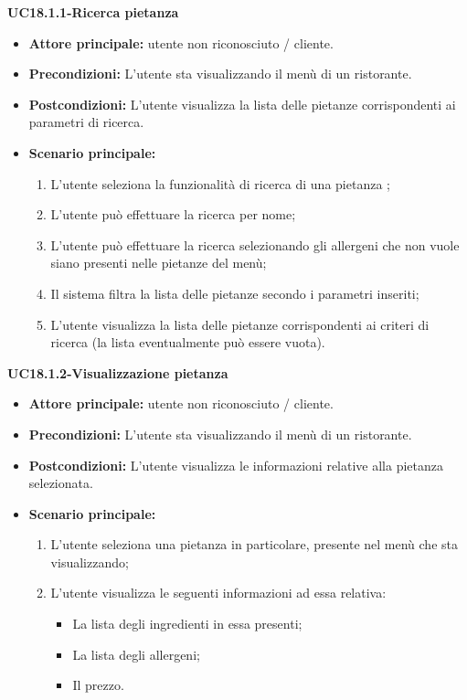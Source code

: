 \textbf{UC18.1.1-Ricerca pietanza}
\begin{itemize}
\item \textbf{Attore principale:} utente non riconosciuto / cliente.
\item \textbf{Precondizioni:} L'utente sta visualizzando il menù di un ristorante.
\item \textbf{Postcondizioni:} L'utente visualizza la lista delle pietanze corrispondenti ai parametri di ricerca.
\item \textbf{Scenario principale:}
\begin{enumerate}
    \item L'utente seleziona la funzionalità di ricerca di una pietanza ;
    \item L'utente può effettuare la ricerca per nome;
    \item L'utente può effettuare la ricerca selezionando gli allergeni che non vuole 
    siano presenti nelle pietanze del menù;
    \item Il sistema filtra la lista delle pietanze secondo i parametri inseriti;
    \item L'utente visualizza la lista delle pietanze corrispondenti ai criteri di ricerca
    (la lista eventualmente può essere vuota).
\end{enumerate}
\end{itemize}



\textbf{UC18.1.2-Visualizzazione pietanza}
\begin{itemize}
\item \textbf{Attore principale:} utente non riconosciuto / cliente.
\item \textbf{Precondizioni:} L'utente sta visualizzando il menù di un ristorante.
\item \textbf{Postcondizioni:} L'utente visualizza le informazioni relative alla pietanza selezionata.
\item \textbf{Scenario principale:}
\begin{enumerate}
    \item L'utente seleziona una pietanza in particolare, presente nel menù che sta visualizzando;
    \item L'utente visualizza le seguenti informazioni ad essa relativa:
    \begin{itemize}
        \item La lista degli ingredienti in essa presenti;
        \item La lista degli allergeni;
        \item Il prezzo.
    \end{itemize}
\end{enumerate}
\end{itemize}

